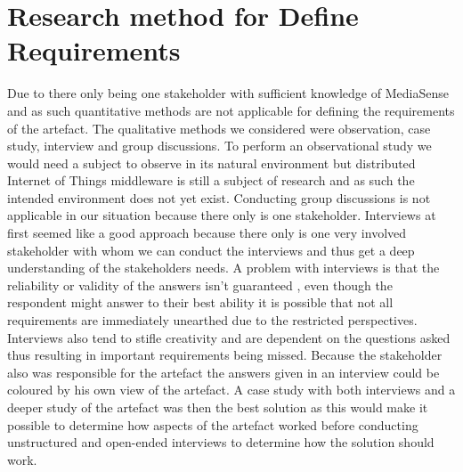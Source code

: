 \section{Research method for Define Requirements}
Due to there only being one stakeholder with sufficient knowledge of MediaSense and as such quantitative methods are not applicable for defining the requirements of the artefact.
The qualitative methods we considered were observation, case study, interview and group discussions. To perform an observational study we would need a subject to observe in its natural environment but distributed Internet of Things middleware is still a subject of research and as such the intended environment does not yet exist. Conducting group discussions is not applicable in our situation because there only is one stakeholder.
Interviews at first seemed like a good approach because there only is one very involved stakeholder with whom we can conduct the interviews and thus get a deep understanding of the stakeholders needs. A problem with interviews is that the reliability or validity of the answers isn't guaranteed \cite{golafshani2003understanding}, even though the respondent might answer to their best ability it is possible that not all requirements are immediately unearthed due to the restricted perspectives. Interviews also tend to stifle creativity and are dependent on the questions asked \cite{johannesson2012design} thus resulting in important requirements being missed. Because the stakeholder also was responsible for the artefact the answers given in an interview could be coloured by his own view of the artefact.
A case study with both interviews and a deeper study of the artefact was then the best solution as this would make it possible to determine how aspects of the artefact worked before conducting unstructured and open-ended interviews to determine how the solution should work.
